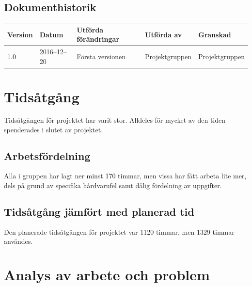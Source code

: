 \documentclass[a4paper,titlepage,12pt]{article}
\begin{document}
\begin{center}
		
		
		\section*{Dokumenthistorik}
		\renewcommand*{\arraystretch}{1.4}
		\begin{longtable}[c]{ l l >{\raggedright}p{5cm} >{\raggedright}p{3cm} l }
			\textbf{Version} & \textbf{Datum} & \textbf{Utförda förändringar} 
			& \textbf{Utförda av} & \textbf{Granskad} \\ \midrule
			
			1.0 & 2016--12--20 & Första versionen & Projektgruppen &
			Projektgruppen \\
			
		\end{longtable}
	\end{center}
	
	
	\newpage
	
	\raggedright
	
	\section{Tidsåtgång}
    Tidsåtgången för projektet har varit stor. Alldeles för mycket av den tiden
    spenderades i slutet av projektet.
	
	\subsection{Arbetsfördelning}
    Alla i gruppen har lagt ner minst 170 timmar, men vissa har fått arbeta
    lite mer, dels på grund av specifika hårdvarufel samt dålig fördelning av
    uppgifter.
	
	\subsection{Tidsåtgång jämfört med planerad tid}
    Den planerade tidsåtgången för projektet var 1120 timmar, men 1329 timmar
    användes.
	
	\section{Analys av arbete och problem}
	
\end{document}
